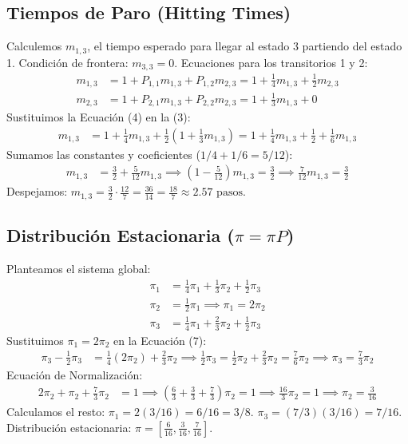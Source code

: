 \documentclass[12pt, a4paper]{article}
\begin{document}
\subsection{Tiempos de Paro (Hitting Times)}
Calculemos $m_{1,3}$, el tiempo esperado para llegar al estado 3 partiendo del estado 1.
Condición de frontera: $m_{3,3} = 0$. Ecuaciones para los transitorios 1 y 2:
\begin{align}
    m_{1,3} &= 1 + P_{1,1}m_{1,3} + P_{1,2}m_{2,3} = 1 + \frac{1}{4}m_{1,3} + \frac{1}{2}m_{2,3} \\
    m_{2,3} &= 1 + P_{2,1}m_{1,3} + P_{2,2}m_{2,3} = 1 + \frac{1}{3}m_{1,3} + 0
\end{align}
Sustituimos la Ecuación (4) en la (3):
\begin{align*}
    m_{1,3} &= 1 + \frac{1}{4}m_{1,3} + \frac{1}{2}\left(1 + \frac{1}{3}m_{1,3}\right) = 1 + \frac{1}{4}m_{1,3} + \frac{1}{2} + \frac{1}{6}m_{1,3}
\end{align*}
Sumamos las constantes y coeficientes ($1/4 + 1/6 = 5/12$):
\begin{align*}
    m_{1,3} &= \frac{3}{2} + \frac{5}{12}m_{1,3} \implies \left(1 - \frac{5}{12}\right)m_{1,3} = \frac{3}{2} \implies \frac{7}{12}m_{1,3} = \frac{3}{2}
\end{align*}
Despejamos: $m_{1,3} = \frac{3}{2} \cdot \frac{12}{7} = \frac{36}{14} = \frac{18}{7} \approx 2.57 \text{ pasos}$.

\subsection{Distribución Estacionaria ($\pi = \pi P$)}
Planteamos el sistema global:
\begin{align}
    \pi_1 &= \frac{1}{4}\pi_1 + \frac{1}{3}\pi_2 + \frac{1}{2}\pi_3 \\
    \pi_2 &= \frac{1}{2}\pi_1 \implies \pi_1 = 2\pi_2 \\
    \pi_3 &= \frac{1}{4}\pi_1 + \frac{2}{3}\pi_2 + \frac{1}{2}\pi_3
\end{align}
Sustituimos $\pi_1 = 2\pi_2$ en la Ecuación (7):
\begin{align*}
    \pi_3 - \frac{1}{2}\pi_3 &= \frac{1}{4}(2\pi_2) + \frac{2}{3}\pi_2 \implies \frac{1}{2}\pi_3 = \frac{1}{2}\pi_2 + \frac{2}{3}\pi_2 = \frac{7}{6}\pi_2 \implies \pi_3 = \frac{7}{3}\pi_2
\end{align*}
Ecuación de Normalización:
\begin{align*}
    2\pi_2 + \pi_2 + \frac{7}{3}\pi_2 &= 1 \implies \left(\frac{6}{3} + \frac{3}{3} + \frac{7}{3}\right)\pi_2 = 1 \implies \frac{16}{3}\pi_2 = 1 \implies \pi_2 = \frac{3}{16}
\end{align*}
Calculamos el resto: $\pi_1 = 2(3/16) = 6/16 = 3/8$. $\pi_3 = (7/3)(3/16) = 7/16$.
Distribución estacionaria: $\pi = \left[ \frac{6}{16}, \frac{3}{16}, \frac{7}{16} \right]$.
\end{document}
